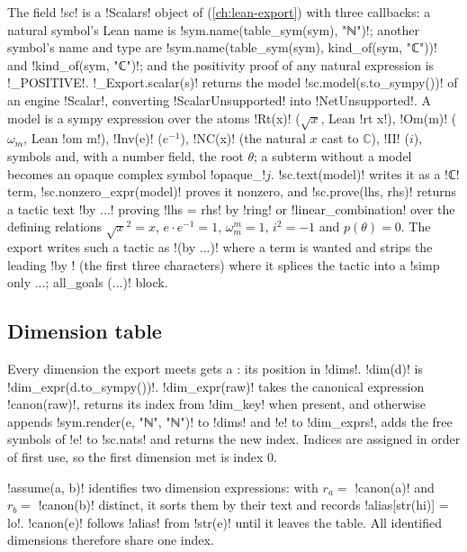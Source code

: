 {The field \py!sc! is a \py!Scalars! object of 
(\cref{ch:lean-export}) with three callbacks: a natural symbol's Lean name is
\py!sym.name(table_sym(sym), "ℕ")!; another symbol's name and type are
\py!sym.name(table_sym(sym), kind_of(sym, "ℂ"))! and \py!kind_of(sym, "ℂ")!; and the positivity
proof of any natural expression is \py!_POSITIVE!. \py!_Export.scalar(s)! returns the model
\py!sc.model(s.to_sympy())! of an engine \py!Scalar!, converting \py!ScalarUnsupported! into
\py!NetUnsupported!. A model is a sympy expression over the atoms \py!Rt(x)! ($\sqrt x$, Lean
\lean!rt x!), \py!Om(m)! ($\omega_m$, Lean \lean!om m!), \py!Inv(e)! ($e^{-1}$), \py!NC(x)! (the
natural $x$ cast to $\mathbb C$), \py!II! ($i$), symbols and, with a number field, the root
$\theta$; a subterm without a model becomes an opaque complex symbol \code!opaque_!$j$.
\py!sc.text(model)! writes it as a \code!ℂ! term, \py!sc.nonzero_expr(model)! proves it nonzero,
and \py!sc.prove(lhs, rhs)! returns a tactic text \code!by ...! proving
\code!lhs = rhs! by \lean!ring! or \lean!linear_combination! over the defining relations
$\sqrt x^2 = x$, $e\cdot e^{-1}=1$, $\omega_m^m = 1$, $i^2 = -1$ and $p(\theta)=0$. The export
writes such a tactic as \code!(by ...)! where a term is wanted and strips the leading \code!by !
(the first three characters) where it splices the tactic into a \lean!simp only ...; all_goals (...)!
block.

\subsection{Dimension table}\label{sec:lean-export-net-dims}

Every dimension the export meets gets a : its position in \py!dims!.
\py!dim(d)! is \py!dim_expr(d.to_sympy())!. \py!dim_expr(raw)! takes the canonical expression
\py!canon(raw)!, returns its index from
\py!dim_key! when present, and otherwise appends \py!sym.render(e, "ℕ", "ℕ")! to \py!dims! and
\py!e! to \py!dim_exprs!, adds the free symbols of \py!e! to \py!sc.nats! and returns the new
index. Indices are assigned in order of first use, so the first dimension met is index 0.

\py!assume(a, b)! identifies two dimension expressions: with $r_a = $ \py!canon(a)! and
$r_b = $ \py!canon(b)! distinct, it sorts them by their text and records
\py!alias[str(hi)] = lo!. \py!canon(e)! follows \py!alias! from \py!str(e)! until it leaves the
table. All identified dimensions therefore share one index.

}
